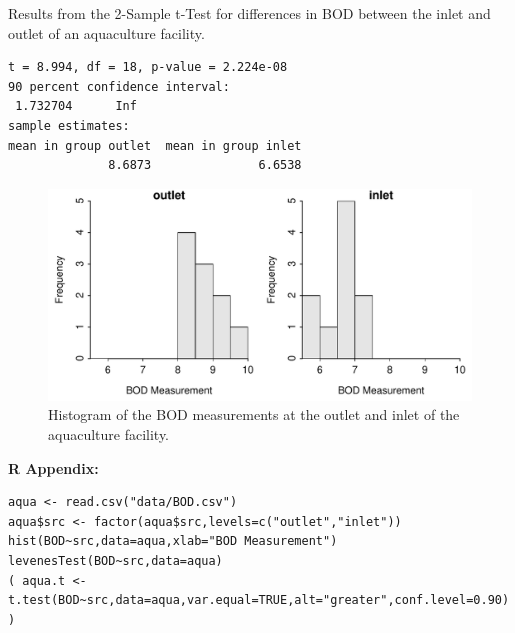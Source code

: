 \documentclass[10pt,openany]{book}\usepackage[]{graphicx}\usepackage[]{color}
\makeatletter
\newenvironment{kframe}{%
 \def\at@end@of@kframe{}%
 \ifinner\ifhmode%
  \def\at@end@of@kframe{\end{minipage}}%
  \begin{minipage}{\columnwidth}%
 \fi\fi%
 \def\FrameCommand##1{\hskip\@totalleftmargin \hskip-\fboxsep
 \colorbox{shadecolor}{##1}\hskip-\fboxsep
     \hskip-\linewidth \hskip-\@totalleftmargin \hskip\columnwidth}%
 \MakeFramed {\advance\hsize-\width
   \@totalleftmargin\z@ \linewidth\hsize
   \@setminipage}}%
 {\par\unskip\endMakeFramed%
 \at@end@of@kframe}
\newenvironment{knitrout}{}{} %
\makeatother
\begin{document}
\begin{table}[h]
  \caption{Results from the 2-Sample t-Test for differences in BOD between the inlet and outlet of an aquaculture facility.}
  \label{tab:2tBOD}
\vspace*{-8pt}
\begin{knitrout}
\color{fgcolor}\begin{kframe}
\begin{verbatim}
t = 8.994, df = 18, p-value = 2.224e-08
90 percent confidence interval:
 1.732704      Inf 
sample estimates:
mean in group outlet  mean in group inlet 
              8.6873               6.6538 
\end{verbatim}
\end{kframe}
\end{knitrout}
\end{table}

\begin{knitrout}
\color{fgcolor}\begin{figure}[hbtp]

{\centering \includegraphics[width=.7\linewidth]{Figs/AquaHist-1} 

}

\caption[Histogram of the BOD measurements at the outlet and inlet of the aquaculture facility]{Histogram of the BOD measurements at the outlet and inlet of the aquaculture facility.}\label{fig:AquaHist}
\end{figure}


\end{knitrout}

\begin{minipage}{\textwidth}
\textbf{R Appendix:}
\begin{knitrout}
\color{fgcolor}\begin{kframe}
\begin{verbatim}
aqua <- read.csv("data/BOD.csv")
aqua$src <- factor(aqua$src,levels=c("outlet","inlet"))
hist(BOD~src,data=aqua,xlab="BOD Measurement")
levenesTest(BOD~src,data=aqua)
( aqua.t <- t.test(BOD~src,data=aqua,var.equal=TRUE,alt="greater",conf.level=0.90) )
\end{verbatim}
\end{kframe}
\end{knitrout}
\end{minipage}






%    
\end{document}

